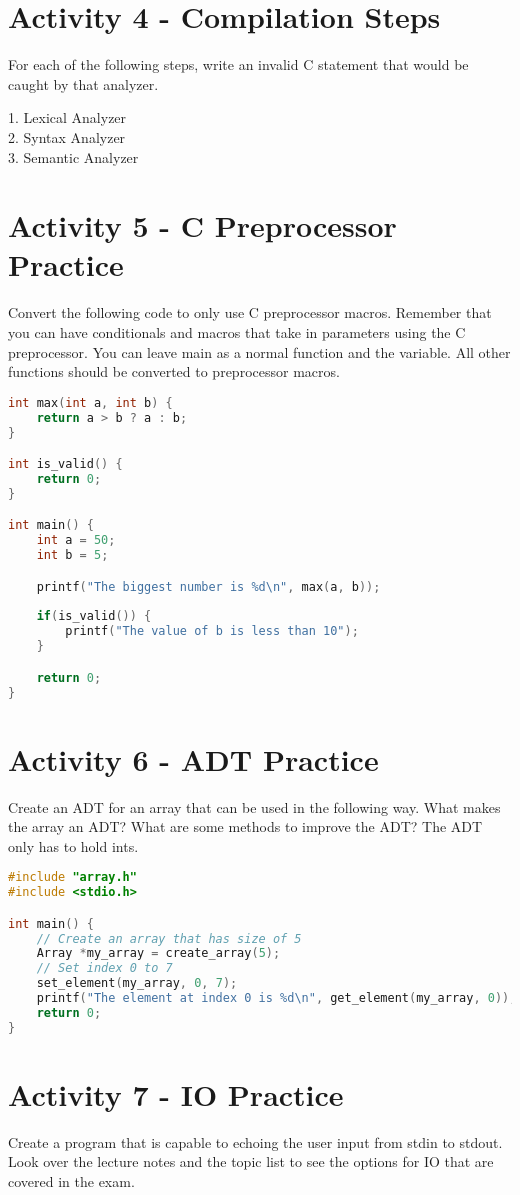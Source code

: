 \documentclass[]{article}
\begin{document}
\section*{Activity 4 - Compilation Steps}
For each of the following steps, write an invalid C statement that would be caught by that
analyzer. \par

1. Lexical Analyzer \\

2. Syntax Analyzer \\

3. Semantic Analyzer \\

\section*{Activity 5 - C Preprocessor Practice}
Convert the following code to only use C preprocessor macros. Remember that you can have
conditionals and macros that take in parameters using the C preprocessor. You can leave main
as a normal function and the variable. All other functions should be converted to preprocessor macros.

\begin{lstlisting}[language=C]
int max(int a, int b) {
    return a > b ? a : b;
}

int is_valid() {
    return 0;
}

int main() {
    int a = 50;
    int b = 5;

    printf("The biggest number is %d\n", max(a, b));
    
    if(is_valid()) {
        printf("The value of b is less than 10");
    }

    return 0;
}
\end{lstlisting}

\section*{Activity 6 - ADT Practice}
Create an ADT for an array that can be used in the following way. What makes the array an ADT?
What are some methods to improve the ADT? The ADT only has to hold ints.

\begin{lstlisting}[language=C]
#include "array.h"
#include <stdio.h>

int main() {
    // Create an array that has size of 5
    Array *my_array = create_array(5);
    // Set index 0 to 7
    set_element(my_array, 0, 7);
    printf("The element at index 0 is %d\n", get_element(my_array, 0));
    return 0;
}
\end{lstlisting}

\section*{Activity 7 - IO Practice}
Create a program that is capable to echoing the user input from stdin to stdout. Look over the
lecture notes and the topic list to see the options for IO that are covered in the exam.
\end{document}
